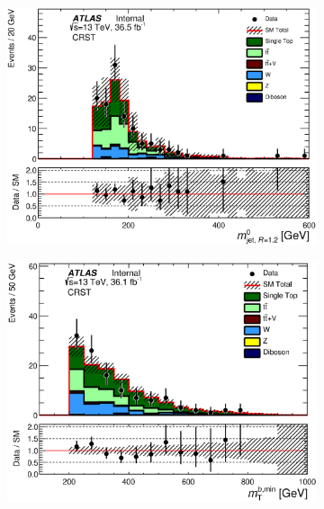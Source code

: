 \begin{figure}[h!]
\begin{center}
\begin{subfigure}[b]{0.40\textwidth}
                \caption{ }
    \end{subfigure}
      \begin{subfigure}[b]{0.40\textwidth}    
\includegraphics[width=\textwidth]{figures/singleTop/postfit/AntiKt12M_0__CRST.eps}
                \caption{ }
    \end{subfigure}
      \begin{subfigure}[b]{0.40\textwidth}    
\includegraphics[width=\textwidth]{figures/singleTop/postfit/MtBMin_CRST.eps}
                \caption{ }
    \end{subfigure}

\end{center}
\end{figure}

